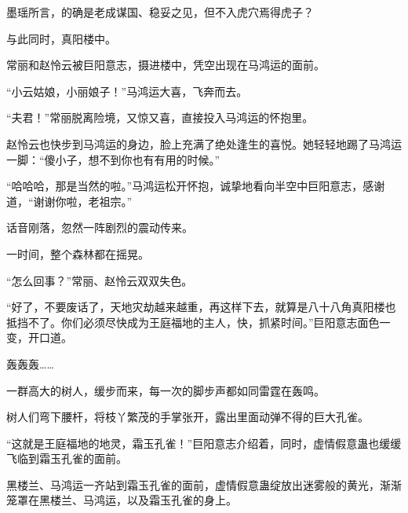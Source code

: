 \begin{this_body}
墨瑶所言，的确是老成谋国、稳妥之见，但不入虎穴焉得虎子？

与此同时，真阳楼中。

常丽和赵怜云被巨阳意志，摄进楼中，凭空出现在马鸿运的面前。

“小云姑娘，小丽娘子！”马鸿运大喜，飞奔而去。

“夫君！”常丽脱离险境，又惊又喜，直接投入马鸿运的怀抱里。

赵怜云也快步到马鸿运的身边，脸上充满了绝处逢生的喜悦。她轻轻地踢了马鸿运一脚：“傻小子，想不到你也有有用的时候。”

“哈哈哈，那是当然的啦。”马鸿运松开怀抱，诚挚地看向半空中巨阳意志，感谢道，“谢谢你啦，老祖宗。”

话音刚落，忽然一阵剧烈的震动传来。

一时间，整个森林都在摇晃。

“怎么回事？”常丽、赵怜云双双失色。

“好了，不要废话了，天地灾劫越来越重，再这样下去，就算是八十八角真阳楼也抵挡不了。你们必须尽快成为王庭福地的主人，快，抓紧时间。”巨阳意志面色一变，开口道。

轰轰轰……

一群高大的树人，缓步而来，每一次的脚步声都如同雷霆在轰鸣。

树人们弯下腰杆，将枝丫繁茂的手掌张开，露出里面动弹不得的巨大孔雀。

“这就是王庭福地的地灵，霜玉孔雀！”巨阳意志介绍着，同时，虚情假意蛊也缓缓飞临到霜玉孔雀的面前。

黑楼兰、马鸿运一齐站到霜玉孔雀的面前，虚情假意蛊绽放出迷雾般的黄光，渐渐笼罩在黑楼兰、马鸿运，以及霜玉孔雀的身上。

\end{this_body}

